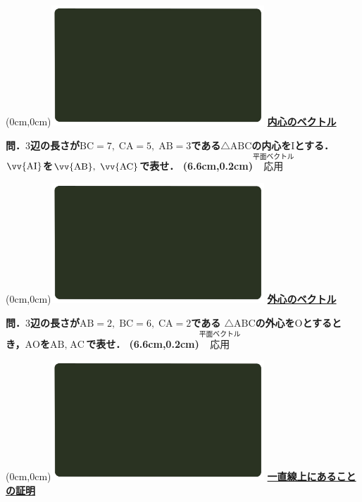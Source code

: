 \documentclass[10pt,
fleqn,
dvipdfmx,
uplatex
]{jsarticle}
\begin{document}
\newpage



\at(0cm,0cm){\includegraphics[width=8cm,bb=0 0 1920 1080]{./youtube/thumbnails/templates/smart_background/平面ベクトル.jpeg}}
{\color{orange}\bf\boldmath\huge\underline{内心のベクトル}}\vspace{0.3zw}

\Large 
\bf\boldmath 問．$3$辺の長さが$\text{BC}=7,\;\text{CA}=5,\;\text{AB}=3$である$\triangle \text{ABC}$の内心を$\text{I}$とする．$\vv{\text{AI}}$を$\vv{\text{AB}} ,\;$$\vv{\text{AC}}$で表せ．
\at(6.6cm,0.2cm){\small\color{bradorange}$\overset{\text{平面ベクトル}}{\text{応用}}$}


\newpage



\at(0cm,0cm){\includegraphics[width=8cm,bb=0 0 1920 1080]{./youtube/thumbnails/templates/smart_background/平面ベクトル.jpeg}}
{\color{orange}\bf\boldmath\huge\underline{外心のベクトル}}\vspace{0.3zw}

\Large 
\bf\boldmath 問．$3$辺の長さが$\text{AB}=2,\;\text{BC}=6,\;\text{CA}=2$である
$\triangle \text{ABC}$の外心を$\text{O}$とするとき，$\text{AO}$を$\text{AB},\;\text{AC}$で表せ．
\at(6.6cm,0.2cm){\small\color{bradorange}$\overset{\text{平面ベクトル}}{\text{応用}}$}


\newpage



\at(0cm,0cm){\includegraphics[width=8cm,bb=0 0 1920 1080]{./youtube/thumbnails/templates/smart_background/平面ベクトル.jpeg}}
{\color{orange}\bf\boldmath\Large\underline{一直線上にあることの証明}}\vspace{0.3zw}
\end{document}
